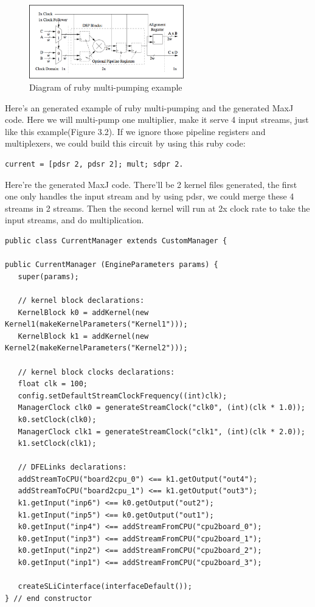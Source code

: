 \documentclass[a4paper, 10pt]{report}
\begin{document}
\begin{figure}[h!]
  \caption{Diagram of ruby multi-pumping example}
  \centering
    \includegraphics[width=0.6\textwidth]{toronto}
\end{figure}

Here's an generated example of ruby multi-pumping and the generated MaxJ code. Here we will multi-pump one multiplier, make it serve 4 input streams, just like this example(Figure 3.2). If we ignore those pipeline registers and multiplexers, we could build this circuit by using this ruby code:

\begin{lstlisting}
current = [pdsr 2, pdsr 2]; mult; sdpr 2.
\end{lstlisting}

Here're the generated MaxJ code. There'll be 2 kernel files generated, the first one only handles the input stream and by using pdsr, we could merge these 4 streams in 2 streams. Then the second kernel will run at 2x clock rate to take the input streams, and do multiplication. 

\begin{lstlisting}[caption=Generated MaxJ code]
public class CurrentManager extends CustomManager {

public CurrentManager (EngineParameters params) {
   super(params);

   // kernel block declarations:
   KernelBlock k0 = addKernel(new Kernel1(makeKernelParameters("Kernel1")));
   KernelBlock k1 = addKernel(new Kernel2(makeKernelParameters("Kernel2")));

   // kernel block clocks declarations:
   float clk = 100;
   config.setDefaultStreamClockFrequency((int)clk);
   ManagerClock clk0 = generateStreamClock("clk0", (int)(clk * 1.0));
   k0.setClock(clk0);
   ManagerClock clk1 = generateStreamClock("clk1", (int)(clk * 2.0));
   k1.setClock(clk1);

   // DFELinks declarations:
   addStreamToCPU("board2cpu_0") <== k1.getOutput("out4");
   addStreamToCPU("board2cpu_1") <== k1.getOutput("out3");
   k1.getInput("inp6") <== k0.getOutput("out2");
   k1.getInput("inp5") <== k0.getOutput("out1");
   k0.getInput("inp4") <== addStreamFromCPU("cpu2board_0");
   k0.getInput("inp3") <== addStreamFromCPU("cpu2board_1");
   k0.getInput("inp2") <== addStreamFromCPU("cpu2board_2");
   k0.getInput("inp1") <== addStreamFromCPU("cpu2board_3");

   createSLiCinterface(interfaceDefault());
} // end constructor
\end{lstlisting}
\end{document}
